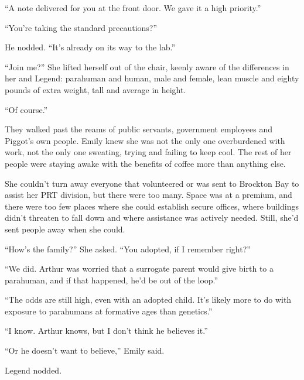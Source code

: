 ``A note delivered for you at the front door.  We gave it a high priority.''



``You're taking the standard precautions?''



He nodded.  ``It's already on its way to the lab.''



``Join me?''  She lifted herself out of the chair, keenly aware of the differences in her and Legend: parahuman and human, male and female, lean muscle and eighty pounds of extra weight, tall and average in height.



``Of course.''



They walked past the reams of public servants, government employees and Piggot's own people.  Emily knew she was not the only one overburdened with work, not the only one sweating, trying and failing to keep cool.  The rest of her people were staying awake with the benefits of coffee more than anything else.



She couldn't turn away everyone that volunteered or was sent to Brockton Bay to assist her PRT division, but there were too many.  Space was at a premium, and there were too few places where she could establish secure offices, where buildings didn't threaten to fall down and where assistance was actively needed.  Still, she'd sent people away when she could.



``How's the family?'' She asked.  ``You adopted, if I remember right?''



``We did.  Arthur was worried that a surrogate parent would give birth to a parahuman, and if that happened, he'd be out of the loop.''



``The odds are still high, even with an adopted child.  It's likely more to do with exposure to parahumans at formative ages than genetics.''



``I know.  Arthur knows, but I don't think he believes it.''



``Or he doesn't want to believe,'' Emily said.



Legend nodded.



